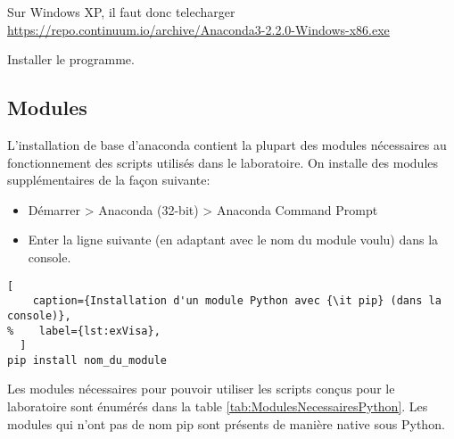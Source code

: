 \documentclass[11pt,francais]{book} %
\begin{document}
	Sur Windows XP, il faut donc telecharger
	\url{https://repo.continuum.io/archive/Anaconda3-2.2.0-Windows-x86.exe}

	Installer le programme. 	

\subsection{Modules}

L'installation de base d'anaconda contient la plupart des modules nécessaires au fonctionnement des scripts utilisés dans le laboratoire.
On installe des modules supplémentaires de la fa\c{c}on suivante:
\begin{itemize}
\item Démarrer > Anaconda (32-bit) > Anaconda Command Prompt
 \item Enter la ligne suivante (en adaptant avec le nom du module voulu) dans la console.
\end{itemize}

\begin{lstlisting}[
    caption={Installation d'un module Python avec {\it pip} (dans la console)},
%    label={lst:exVisa},
  ]
pip install nom_du_module
\end{lstlisting}

Les modules nécessaires pour pouvoir utiliser les scripts con\c{c}us pour le laboratoire sont énumérés dans la table \ref{tab:ModulesNecessairesPython}.
Les modules qui n'ont pas de nom pip sont présents de manière native sous Python.

\begin{table}[htb]
  \caption{Modules nécessaires au fonctionnement des scripts du laboratoire}
  \label{tab:ModulesNecessairesPython}
  \centering
\end{table}
\end{document}
